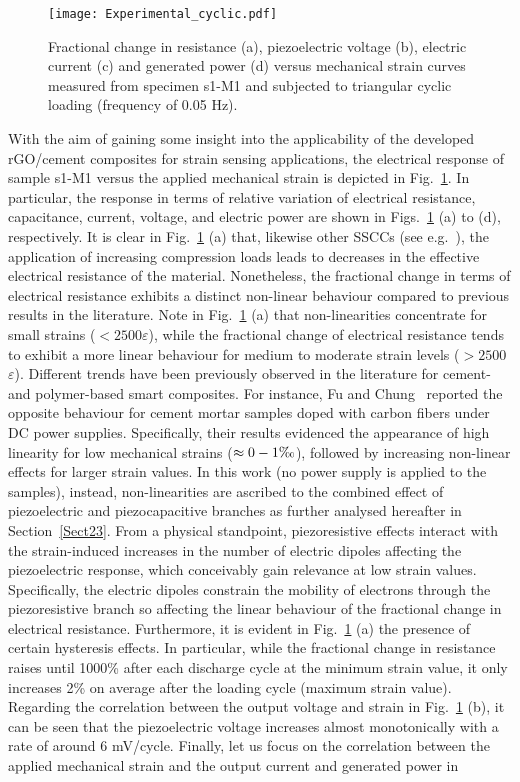 \documentclass[a4paper,fleqn]{cas-sc}
\begin{document}
\begin{figure}[ht]
\centering
\texttt{[image: Experimental\_cyclic.pdf]}
\caption{Fractional change in resistance (a), piezoelectric voltage (b), electric current (c) and generated power (d) versus mechanical strain curves measured from specimen s1-M1 and subjected to triangular cyclic loading (frequency of 0.05 Hz).}
\label{sensor}
\end{figure}

With the aim of gaining some insight into the applicability of the developed rGO/cement composites for strain sensing applications, the electrical response of sample s1-M1 versus the applied mechanical strain is depicted in Fig.~\ref{sensor}. In particular, the response in terms of relative variation of electrical resistance, capacitance, current, voltage, and electric power are shown in Figs.~\ref{sensor} (a) to (d), respectively. It is clear in Fig.~\ref{sensor} (a) that, likewise other SSCCs (see e.g.~\cite{DaAlessandro2014}), the application of increasing compression loads leads to decreases in the effective electrical resistance of the material. Nonetheless, the fractional change in terms of electrical resistance exhibits a distinct non-linear behaviour compared to previous results in the literature. Note in Fig.~\ref{sensor} (a) that non-linearities concentrate for small strains ($<2500$\textmu$\varepsilon$), while the fractional change of electrical resistance tends to exhibit a more linear behaviour for medium to moderate strain levels ($>2500$\textmu$\varepsilon$). Different trends have been previously observed in the literature for cement- and polymer-based smart composites. For instance, Fu and Chung~\cite{fu1997effect} reported the opposite behaviour for cement mortar samples doped with carbon fibers under DC power supplies. Specifically, their results evidenced the appearance of high linearity for low mechanical strains ($\approx 0-1\text{\textperthousand}$), followed by increasing non-linear effects for larger strain values. In this work (no power supply is applied to the samples), instead, non-linearities are ascribed to the combined effect of piezoelectric and piezocapacitive branches as further analysed hereafter in Section~\ref{Sect23}. From a physical standpoint, piezoresistive effects interact with the strain-induced increases in the number of electric dipoles affecting the piezoelectric response, which conceivably gain relevance at low strain values. Specifically, the electric dipoles constrain the mobility of electrons through the piezoresistive branch so affecting the linear behaviour of the fractional change in electrical resistance. Furthermore, it is evident in Fig.~\ref{sensor} (a) the presence of certain hysteresis effects. In particular, while the fractional change in resistance raises until 1000\% after each discharge cycle at the minimum strain value, it only increases 2\% on average after the loading cycle (maximum strain value). Regarding the correlation between the output voltage and strain in Fig.~\ref{sensor} (b), it can be seen that the piezoelectric voltage increases almost monotonically with a rate of around 6 mV/cycle. Finally, let us focus on the correlation between the applied mechanical strain and the output current and generated power in 
\end{document}
